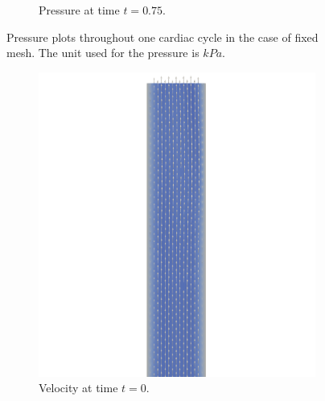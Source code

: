 \documentclass[a4paper,11pt,openright,twoside]{book}
\begin{document}
\begin{figure}[h!]
\begin{subfigure}[b]{0.5\linewidth}
        \centering
    \caption{Pressure at time $t = 0.75$.} 
    \label{fig4:d} 
  \end{subfigure} 
  \centering
  \caption{Pressure plots throughout one cardiac cycle in the case of fixed mesh. The unit used for the pressure is $kPa$.}
  \label{fig4} 
\end{figure}


\begin{figure}[h!] 
  \begin{subfigure}[b]{0.5\linewidth}
    \centering
    \includegraphics[width=1.2\linewidth]{images/velocity_30_0.png} 
        \centering
    \caption{Velocity at time $t = 0$.} 
    \label{fig2:a} 
    \vspace{4ex}
  \end{subfigure}%
  \begin{subfigure}[b]{0.5\linewidth}
    \centering

\end{subfigure}
\end{figure}
\end{document}
